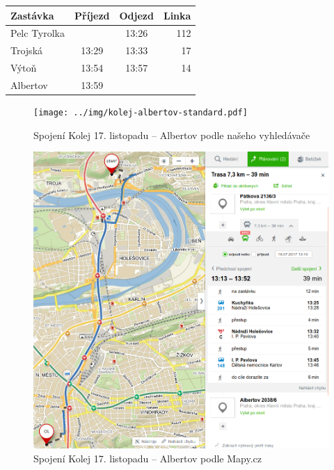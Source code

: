\begin{center}
\begin{tabular}{|l c c r|}\hline
{\bf Zastávka}&{\bf Příjezd}&{\bf Odjezd}&{\bf Linka}\\\hline
Pelc Tyrolka&&13:26&112\\
Trojská&13:29&13:33&17\\
Výtoň&13:54&13:57&14\\
Albertov&13:59&&\\\hline
\end{tabular} 
\end{center}
\begin{figure}[h]
  \centering
    \texttt{[image: ../img/kolej-albertov-standard.pdf]}
  \caption{Spojení Kolej 17. listopadu -- Albertov podle našeho vyhledávače}
  \label{fig:kolej-albertov-standard}
\end{figure}
\begin{figure}[h]
  \centering
    \includegraphics[width=\textwidth]{../img/kolej-albertov-seznam.png}
  \caption{Spojení Kolej 17. listopadu -- Albertov podle Mapy.cz}
  \label{fig:kolej-albertov-seznam}
\end{figure}
